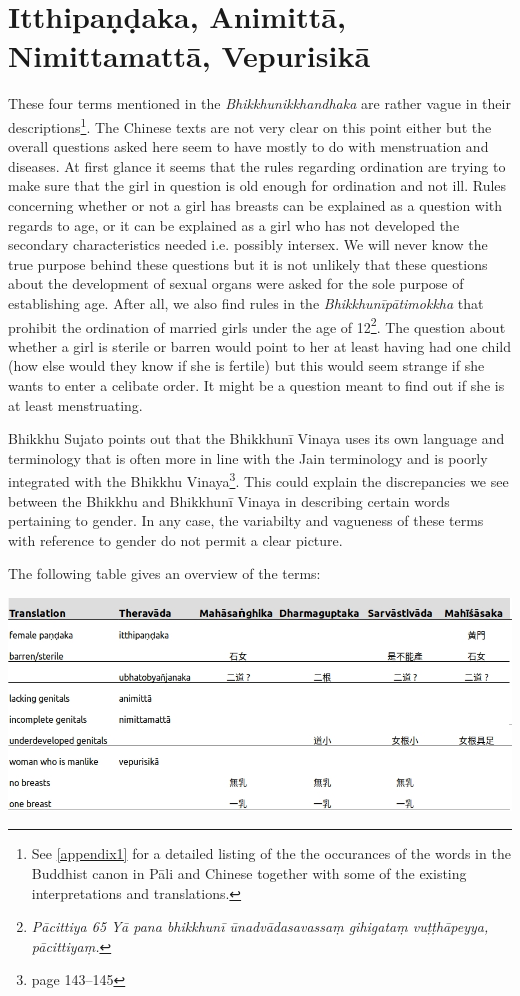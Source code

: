\section{Itthipaṇḍaka, Animittā, Nimittamattā, Vepurisikā}

These four terms mentioned in the {\em Bhikkhunikkhandhaka} are rather vague in their descriptions\footnote{See \ref{appendix1} for a detailed listing of the the occurances of the words in the Buddhist canon in Pāli and Chinese together with some of the existing interpretations and translations.}. The Chinese texts are not very clear on this point either but the overall questions asked here seem to have mostly to do with menstruation and diseases. At first glance it seems that the rules regarding ordination are trying to make sure that the girl in question is old enough for ordination and not ill. Rules concerning whether or not a girl has breasts can be explained as a question with regards to age, or it can be explained as a girl who has not developed the secondary characteristics needed i.e. possibly intersex. We will never know the true purpose behind these questions but it is not unlikely that these questions about the development of sexual organs were asked for the sole purpose of establishing age. After all, we also find rules in the {\em Bhikkhunīpātimokkha} that prohibit the ordination of married girls under the age of 12\footnote{{\em Pācittiya 65 Yā pana bhikkhunī ūnad­vāda­sa­vassaṃ gihigataṃ vuṭṭhāpeyya, pācittiyaṃ.}}. The question about whether a girl is sterile or barren would point to her at least having had one child (how else would they know if she is fertile) but this would seem strange if she wants to enter a celibate order. It might be a question meant to find out if she is at least menstruating. 

Bhikkhu Sujato points out that the Bhikkhunī Vinaya uses its own language and terminology that is often more in line with the Jain terminology and is poorly integrated with the Bhikkhu Vinaya\footnote{\cite{sujato2009} page 143–145}. This could explain the discrepancies we see between the Bhikkhu and Bhikkhunī Vinaya in describing certain words pertaining to gender. In any case, the variabilty and vagueness of these terms with reference to gender do not permit a clear picture.

The following table gives an overview of the terms:

\bigskip
\includegraphics[width=\linewidth]{female.jpg}
\label{female}

